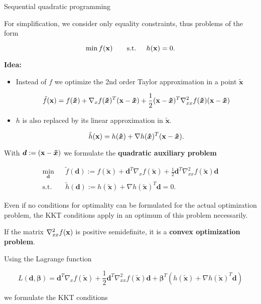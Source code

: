 \begin{vbframe}{Sequential quadratic programming}

For simplification, we consider only equality constraints, thus problems of the form

$$
\min f(\mathbf{x}) \qquad \text{s.t. } \quad h(\mathbf{x}) = 0.
$$

\textbf{Idea:}

\begin{itemize}
\item Instead of $f$ we optimize the 2nd order Taylor approximation in a point $\bm{\tilde x}$

$$
\tilde f(\mathbf{x}) = f(\bm{\tilde x}) +  \nabla_{x} f(\bm{\tilde x})^T (\mathbf{x}- \bm{\tilde x})+ \frac{1}{2} (\mathbf{x}- \bm{\tilde x})^T \nabla^2_{xx} f(\bm{\tilde x}) (\mathbf{x}- \bm{\tilde x})
$$

\item $h$ is also replaced by its linear approximation in $\bm{\tilde x}$.

$$
\tilde h(\mathbf{x}) = h(\bm{\tilde x}) + \nabla h(\bm{\tilde x})^T(\mathbf{x}- \bm{\tilde x}).
$$
\end{itemize}

\framebreak

With $\bm{d} := (\mathbf{x}- \bm{\tilde x})$ we formulate the \textbf{quadratic auxiliary problem}

\begin{eqnarray*}
\min_{\bm{d}} && \tilde f(\bm{d}) := f(\bm{\tilde x}) + \bm{d}^T \nabla_{x} f(\bm{\tilde x}) + \frac{1}{2} \bm{d}^T \nabla^2_{xx} f(\bm{\tilde x}) \bm{d} \\
\text{s.t. } && \tilde h(\bm{d}) :=  h(\bm{\tilde x}) + \nabla h(\bm{\tilde x})^T\bm{d} = 0.
\end{eqnarray*}

Even if no conditions for optimality can be formulated for the actual optimization problem, the KKT conditions apply in an optimum of this problem necessarily.

\lz

If the matrix $\nabla^2_{xx} f(\mathbf{x})$ is positive semidefinite, it is a \textbf{convex optimization problem}.

\framebreak

Using the Lagrange function

$$
L(\bm{d}, \bm{\beta}) = \bm{d}^T \nabla_{x} f(\bm{\tilde x}) + \frac{1}{2} \bm{d}^T \nabla^2_{xx} f(\bm{\tilde x}) \bm{d} + \bm{\beta}^T (h(\bm{\tilde x}) + \nabla h(\bm{\tilde x})^T\bm{d})
$$

we formulate the KKT conditions


\end{vbframe}

